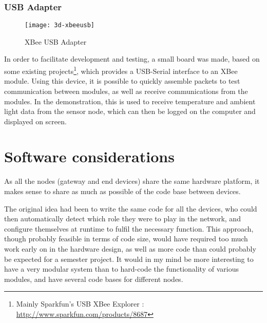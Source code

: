 


\subsubsection{USB Adapter}
\label{sub2:xbee-usb}

\begin{figure}[h]
  \begin{center}
    \texttt{[image: 3d-xbeeusb]}
  \end{center}
  \caption{XBee USB Adapter}
  \label{fig:xbeeusb}
\end{figure}

In order to facilitate development and testing, a small board was made,
based on some existing projects\footnote{Mainly Sparkfun's USB XBee Explorer :
\url{http://www.sparkfun.com/products/8687}}, which provides a USB-Serial
interface to an XBee module. Using this device, it is possible to quickly
assemble packets to test communication between modules, as well as receive
communications from the modules. In the demonstration, this is used to receive
temperature and ambient light data from the sensor node, which can then be
logged on the computer and displayed on screen.

\section{Software considerations}

As all the nodes (gateway and end devices) share the same hardware platform, it
makes sense to share as much as possible of the code base between devices.

The original idea had been to write the same code for all the devices, who could
then automatically detect which role they were to play in the network, and
configure themselves at runtime to fulfil the necessary function. This approach,
though probably feasible in terms of code size, would have required too much
work early on in the hardware design, as well as more code than could probably
be expected for a semester project. It would in my mind be more interesting to
have a very modular system than to hard-code the functionality of various
modules, and have several code bases for different nodes.

